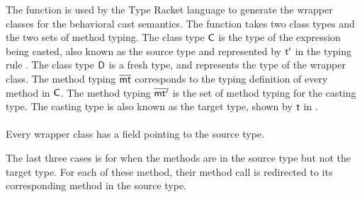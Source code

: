 \documentclass[acmlarge, anonymous, authordraft]{acmart}
\begin{document}
The  function is used by the Type Racket language to generate the wrapper classes
for the behavioral cast semantics. The  function takes two class types and the two
sets of method typing. The class type ${\sf{C}}$ is the type of the expression being casted, also known 
as the source type and represented by $\tp$ in the typing rule .
The class type ${\sf{D}}$ is a fresh type, and represents the type of the wrapper class.
The method typing $\overline{{\sf{mt}}}$ corresponds to the typing definition of every method in ${\sf{C}}$.
The method typing $\overline{{\sf{mt'}}}$ is the set of method typing for the casting type. The casting
type is also known as the target type, shown by $\t$ in . \\
 
 \\

Every wrapper class has a  field pointing to the source type.


The last three cases is for when the methods are in the source type but not the 
target type. For each of these method, their method call is redirected 
to its corresponding method in the source type.


\renewcommand{\bscast}[2]{\EM{\BehCast{#1}{{#2}}}}
\end{document}
